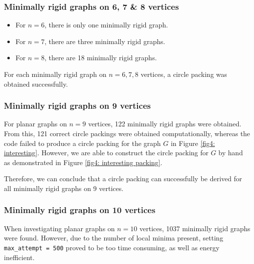 \subsubsection{Minimally rigid graphs on 6, 7 \& 8 vertices}

\begin{itemize}
    \item For $n = 6$, there is only one minimally rigid graph.
    \vspace{-3mm}
    \item For $n=7$, there are three minimally rigid graphs.
    \vspace{-3mm}
    \item For $n=8$, there are 18 minimally rigid graphs.
\end{itemize}

\begin{flushleft}
For each minimally rigid graph on $n=6,7,8$ vertices, a circle packing was obtained successfully.
\end{flushleft}

\subsubsection{Minimally rigid graphs on 9 vertices}

\begin{flushleft}
For planar graphs on $n=9$ vertices, 122 minimally rigid graphs were obtained. From this, 121 correct circle packings were obtained computationally, whereas the code failed to produce a circle packing for the graph $G$ in Figure \ref{fig4: interesting}. However, we are able to construct the circle packing for $G$ by hand as demonstrated in Figure \ref{fig4: interesting packing}.
\end{flushleft}

\begin{flushleft}
Therefore, we can conclude that a circle packing can successfully be derived for all minimally rigid graphs on 9 vertices.
\end{flushleft}

\subsubsection{Minimally rigid graphs on 10 vertices}

\begin{flushleft}
When investigating planar graphs on $n=10$ vertices, 1037 minimally rigid graphs were found. However, due to the number of local minima present, setting \texttt{max\_attempt = 500} proved to be too time consuming, as well as energy inefficient.
\end{flushleft}

